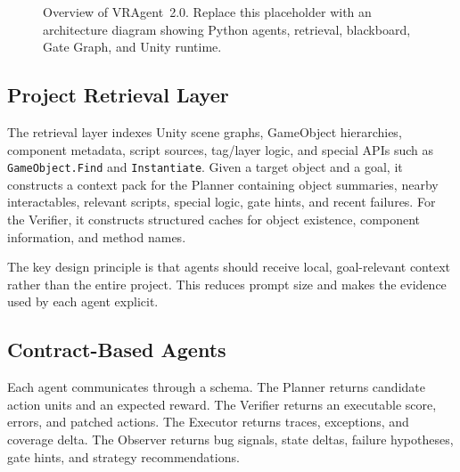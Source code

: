 \documentclass[10pt,conference]{IEEEtran}
\newcommand{\tool}{VRAgent~2.0}
\begin{document}
\begin{figure}[t]
\centering
{}
\caption{Overview of \tool. Replace this placeholder with an architecture diagram
showing Python agents, retrieval, blackboard, Gate Graph, and Unity runtime.}
\label{fig:overview}
\end{figure}

\subsection{Project Retrieval Layer}

The retrieval layer indexes Unity scene graphs, GameObject hierarchies,
component metadata, script sources, tag/layer logic, and special APIs such as
\texttt{GameObject.Find} and \texttt{Instantiate}. Given a target object and a
goal, it constructs a context pack for the Planner containing object summaries,
nearby interactables, relevant scripts, special logic, gate hints, and recent
failures. For the Verifier, it constructs structured caches for object existence,
component information, and method names.

The key design principle is that agents should receive local, goal-relevant
context rather than the entire project. This reduces prompt size and makes the
evidence used by each agent explicit.

\subsection{Contract-Based Agents}

Each agent communicates through a schema. The Planner returns candidate action
units and an expected reward. The Verifier returns an executable score, errors,
and patched actions. The Executor returns traces, exceptions, and coverage
delta. The Observer returns bug signals, state deltas, failure hypotheses, gate
hints, and strategy recommendations.
\end{document}
